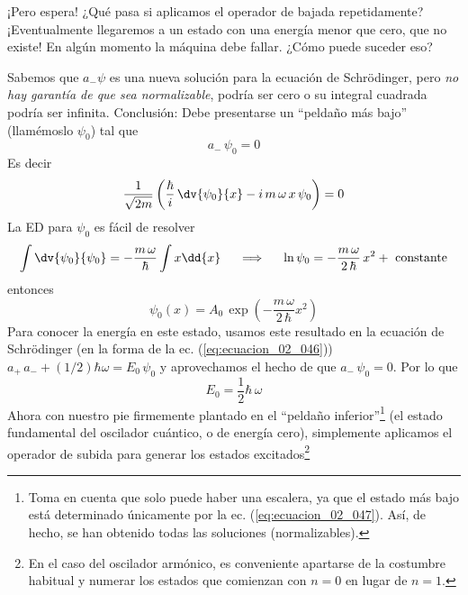 ¡Pero espera! ¿Qué pasa si aplicamos el operador de bajada repetidamente? ¡Eventualmente llegaremos a un estado con una energía menor que cero, que no existe! En algún momento la máquina debe fallar. ¿Cómo puede suceder eso? 
\par
Sabemos que $a_{-} \psi$ es una nueva solución para la ecuación de Schrödinger, pero \emph{no hay garantía de que sea normalizable}, podría ser cero o su integral cuadrada podría ser infinita. Conclusión: Debe presentarse un \enquote{peldaño más bajo} (llamémoslo $\psi_{0}$) tal que
\begin{equation}
a_{-} \, \psi_{0} = 0
\label{eq:ecuacion_02_047}
\end{equation}
Es decir
\begin{align*}
\dfrac{1}{\sqrt{2 m}} \left( \dfrac{\hbar}{i} \, \dv{\psi_{0}}{x} - i \, m \, \omega \, x \, \psi_{0} \right) = 0
\end{align*}
La ED para $\psi_{0}$ es fácil de resolver
\begin{align*}
\int \dv{\psi_{0}}{\psi_{0}} = - \dfrac{m \, \omega}{\hbar} \int x \dd{x} \hspace{0.5cm} \Longrightarrow \hspace{0.5cm} \ln \psi_{0} = - \dfrac{m \, \omega}{2 \, \hbar} \, x^{2} + \text{ constante}
\end{align*}
entonces
\begin{equation}
\psi_{0} (x) = A_{0} \, \exp \left( - \dfrac{m \, \omega}{2 \, \hbar} x^{2} \right)
\label{eq:ecuacion_02_048}
\end{equation}
Para conocer la energía en este estado, usamos este resultado en la ecuación de Schrödinger (en la forma de la ec. (\ref{eq:ecuacion_02_046})) $a_{+} \, a_{-} + (1/2) \hbar \omega = E_{0} \, \psi_{0}$ y aprovechamos el hecho de que $a_{-} \, \psi_{0} = 0$. Por lo que
\begin{equation}
E_{0} = \dfrac{1}{2} \hbar \, \omega
\label{eq:ecuacion_02_049}
\end{equation}
Ahora con nuestro pie firmemente plantado en el \enquote{peldaño inferior}\footnote{Toma en cuenta que solo puede haber una escalera, ya que el estado más bajo está determinado únicamente por la ec. (\ref{eq:ecuacion_02_047}). Así, de hecho, se han obtenido todas las soluciones (normalizables).}
 (el estado fundamental del oscilador cuántico, o de energía cero), simplemente aplicamos el operador de subida para generar los estados excitados\footnote{ En el caso del oscilador armónico, es conveniente apartarse de la costumbre habitual y numerar los estados que comienzan con $n = 0$ en lugar de $n = 1$.}

